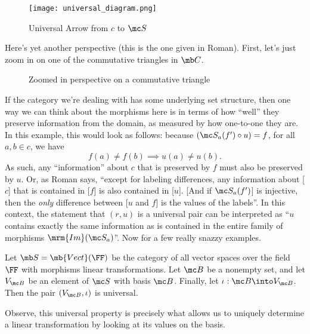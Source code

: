 \documentclass{fkbook}
\theoremstyle{snazzydefinition}
\newenvironment{example}
  {\pushQED{\oldqed}\renewcommand{\qedsymbol}{$\triangle$}\examplex}
  {\popQED\endexamplex}
\begin{document}
  \begin{figure}[h]
    \centering
    \texttt{[image: universal\_diagram.png]}
    \caption{Universal Arrow from $c$ to $\mc S$}
    \label{fig:universal}
  \end{figure}
  Here's yet another perspective (this is the one given in Roman).
  First, let's just zoom in on one of the commutative triangles in
  $\mb C$.
  \begin{figure}[H]
    \centering
    \caption{Zoomed in perspective on a commutative triangle}
    \label{fig:universaltriangle}
  \end{figure}
  If the category we're dealing with has some underlying set
  structure, then one way we can think about the morphisms here is in
  terms of how ``well'' they preserve information from the domain, as
  measured by how one-to-one they are. In this example, this would
  look as follows: because $(\mc S_a(f') \circ u) = f$, for all $a,b
  \in c$, we have
  \[
    f(a) \neq f(b) \implies u(a) \neq u(b).
  \]
  As such, any ``information'' about $c$ that is preserved by $f$ must
  also be preserved by $u$. Or, as Roman says, ``except for labeling
  differences, any information about [$c$] that is contained in [$f$]
  is also contained in [$u$]. [And if $\mc S_a(f')$] is injective,
  then the \emph{only} difference between [$u$ and $f$] is the values
  of the labels''. In this context, the statement that $(r,u)$ is a
  universal pair can be interpreted as ``$u$ contains exactly the same
  information as is contained in the entire family of morphisms
  $\mrm{Im}(\mc S_a)$''. Now for a few really snazzy examples.
  \begin{leftbar}\vspace{-1em}
    \begin{example}[Bases]
      Let $\mb S = \mb{Vect}(\FF)$ be the category of all vector spaces
      over the field $\FF$ with morphisms linear transformations. Let
      $\mc B$ be a nonempty set, and let $V_{\mc B}$ be an element of
      $\mc S$ with basis $\mc B$. Finally, let $\iota : \mc B \into
      V_{\mc B}$. Then the pair $(V_{\mc B}, \iota)$ is universal.

      Observe, this universal property is precisely what allows us to
      uniquely determine a linear transformation by looking at its
      values on the basis.
    \end{example}
  \end{leftbar}
\end{document}
